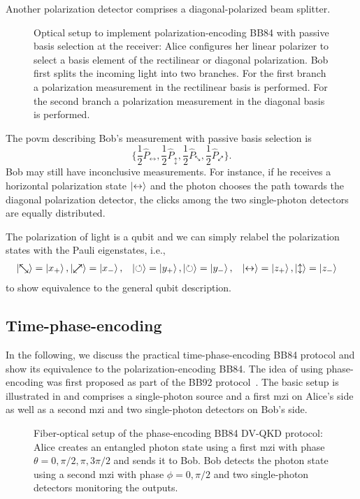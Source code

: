 Another polarization detector comprises a diagonal-polarized beam splitter.
\begin{figure}[htb]
	\centering
	
	\caption{Optical setup to implement polarization-encoding BB84 with passive basis selection at the receiver: Alice configures her linear polarizer to select a basis element of the rectilinear or diagonal polarization. Bob first splits the incoming light into two branches. For the first branch a polarization measurement in the rectilinear basis is performed. For the second branch a polarization measurement in the diagonal basis is performed.}\label{fig:polarization_encoding_passive}
\end{figure}
The \gls{povm} describing Bob's measurement with passive basis selection is
\begin{equation}
	\biggl\{
		\frac{1}{2}\hat{P}_{\leftrightarrow},
		\frac{1}{2}\hat{P}_{\updownarrow},
		\frac{1}{2}\hat{P}_{\nwsearrow},
		\frac{1}{2}\hat{P}_{\neswarrow}
	\biggr\}
	.
\end{equation}
Bob may still have inconclusive measurements.
For instance, if he receives a horizontal polarization state $\ket{\leftrightarrow}$ and the photon chooses the path towards the diagonal polarization detector, the clicks among the two single-photon detectors are equally distributed.

The polarization of light is a qubit and we can simply relabel the polarization states with the Pauli eigenstates, i.e.,
\begin{align}
	\ket{\nwsearrow}
	=
	\ket{x_+},
	&
	\ket{\neswarrow}
	=
	\ket{x_-},
	&
	\ket{\circlearrowleft}
	=
	\ket{y_+},
	&
	\ket{\circlearrowright}
	=
	\ket{y_-},
	&
	\ket{\leftrightarrow}
	=
	\ket{z_+},
	&
	\ket{\updownarrow}
	=
	\ket{z_-}
\end{align}
to show equivalence to the general qubit description.

\FloatBarrier
\subsection{Time-phase-encoding}

In the following, we discuss the practical time-phase-encoding BB84 protocol and show its equivalence to the polarization-encoding BB84.
The idea of using phase-encoding was first proposed as part of the BB92 protocol~\cite{Bennett1992}.
The basic setup is illustrated in  and comprises a single-photon source and a first \gls{mzi} on Alice's side as well as a second \gls{mzi} and two single-photon detectors on Bob's side.
\begin{figure}[htb]
	\centering
	
	\caption{Fiber-optical setup of the phase-encoding BB84 DV-QKD protocol: Alice creates an entangled photon state using a first \gls{mzi} with phase $\theta=0,\pi/2,\pi,3\pi/2$ and sends it to Bob. Bob detects the photon state using a second \gls{mzi} with phase $\phi=0,\pi/2$ and two single-photon detectors monitoring the outputs.}\label{fig:qubit_time_phase_active}
\end{figure}

